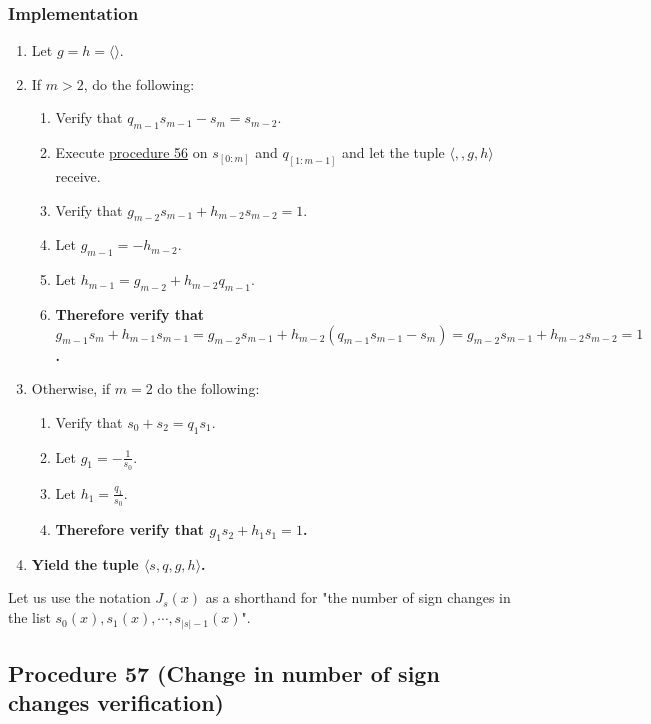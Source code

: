 \documentclass[twocolumn]{article}
\begin{document}
			\subsubsection{Implementation}
				\begin{enumerate}
					\item Let $g=h=\langle\rangle$.
					\item If $m>2$, do the following:
					\begin{enumerate}
						\item Verify that $q_{m-1}s_{m-1}-s_{m}=s_{m-2}$.
						\item Execute \hyperref[sec:procedure 56]{procedure 56} on $s_{[0:m]}$ and $q_{[1:m-1]}$ and let the tuple $\langle,,g,h\rangle$ receive.
						\item Verify that $g_{m-2}s_{m-1}+h_{m-2}s_{m-2}=1$.
						\item Let $g_{m-1}=-h_{m-2}$.
						\item Let $h_{m-1}=g_{m-2}+h_{m-2}q_{m-1}$.
						\item \textbf{Therefore verify that $g_{m-1}s_{m}+h_{m-1}s_{m-1}=g_{m-2}s_{m-1}+h_{m-2}(q_{m-1}s_{m-1}-s_{m})=g_{m-2}s_{m-1}+h_{m-2}s_{m-2}=1$.}
					\end{enumerate}
					\item Otherwise, if $m=2$ do the following:
					\begin{enumerate}
						\item Verify that $s_{0}+s_{2}=q_1s_1$.
						\item Let $g_1=-\frac{1}{s_0}$.
						\item Let $h_1=\frac{q_1}{s_0}$.
						\item \textbf{Therefore verify that $g_1s_2+h_1s_1=1$.}
					\end{enumerate}
					\item \textbf{Yield the tuple $\langle s,q,g,h\rangle$.}
				\end{enumerate}
		Let us use the notation $J_{s}(x)$ as a shorthand for "the number of sign changes in the list $s_0(x),s_1(x),\cdots,s_{\lvert s\rvert-1}(x)$".
		\subsection{Procedure 57 (Change in number of sign changes verification)}\label{sec:procedure 57}
\end{document}
